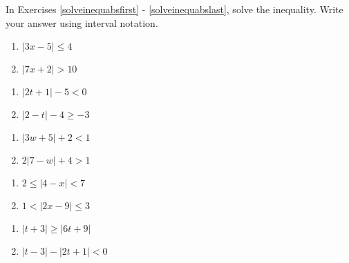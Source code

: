 \documentclass{ximera}
\begin{document}
In Exercises \ref{solveinequabsfirst} - \ref{solveinequabslast}, solve the inequality.  Write your answer using interval notation. 

\begin{multicols}{2}
\begin{enumerate}
\setcounter{enumi}{\value{HW}}
\item $|3x - 5| \leq 4$ \label{solveinequabsfirst}
\item $|7x + 2| > 10$

\setcounter{HW}{\value{enumi}}
\end{enumerate}
\end{multicols}

\begin{multicols}{2}
\begin{enumerate}
\setcounter{enumi}{\value{HW}}

\item $|2t+1| - 5 < 0$   
\item $|2-t| - 4 \geq -3$

\setcounter{HW}{\value{enumi}}
\end{enumerate}
\end{multicols}

\begin{multicols}{2}
\begin{enumerate}
\setcounter{enumi}{\value{HW}}

\item $|3w+5| + 2 < 1$   
\item $2|7-w| +4 > 1$

\setcounter{HW}{\value{enumi}}
\end{enumerate}
\end{multicols}

\begin{multicols}{2}
\begin{enumerate}
\setcounter{enumi}{\value{HW}}

\item  $2 \leq |4-x| < 7$ 
\item $1 < |2x - 9| \leq 3$

\setcounter{HW}{\value{enumi}}
\end{enumerate}
\end{multicols}

\begin{multicols}{2}
\begin{enumerate}
\setcounter{enumi}{\value{HW}}

\item $|t + 3| \geq |6t + 9|$
\item  $|t-3| - |2t+1| < 0$ 

\setcounter{HW}{\value{enumi}}
\end{enumerate}
\end{multicols}
\end{document}
